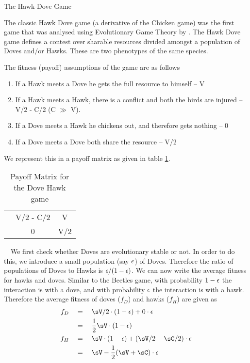 \documentclass{article}
\begin{document}
\begin{ssection}{The Hawk-Dove Game}

	The classic Hawk Dove game (a derivative of the Chicken game) was the first game that was analysed using Evolutionary Game Theory by \cite{smith}. The Hawk Dove game defines a contest over sharable resources divided amongst a population of Doves and/or Hawks. These are two phenotypes of the same species.

	The fitness (payoff) assumptions of the game are as follows
	\begin{enumerate}
		\item If a Hawk meets a Dove he gets the full resource to himself -- V
		\item If a Hawk meets a Hawk, there is a conflict and both the birds are injured -- V/2 - C/2 (C $\gg$ V).
		\item If a Dove meets a Hawk he chickens out, and therefore gets nothing -- 0
		\item If a Dove meets a Dove both share the resource -- V/2
	\end{enumerate}

	We represent this in a payoff matrix as given in table \ref{tab:payoff-dhg}.

	\begin{table}
		\centering
		\begin{tabular}{c | c | c}
			& \bt{Hawk} & \bt{Dove} \\
			\hline
			\bt{Hawk} & V/2 - C/2 & V \\
			\hline
			\bt{Dove} & 0 & V/2
		\end{tabular}
		\caption{Payoff Matrix for the Dove Hawk game}
		\label{tab:payoff-dhg}
	\end{table}

	 \ \ We first check whether Doves are evolutionary stable or not. In order to do this, we introduce a small population (say $\epsilon$) of Doves. Therefore the ratio of populations of Doves to Hawks is $\epsilon / (1 - \epsilon)$. We can now write the average fitness for hawks and doves. Similar to the Beetles game, with probability $1 - \epsilon$ the interaction is with a dove, and with probability $\epsilon$ the interaction is with a hawk. Therefore the average fitness of doves ($f_D$) and hawks ($f_H$) are given as
	\begin{align*}
		f_D &\eq \sV/2 \cdot (1 - \eps) + 0 \cdot \eps \\&\eq \frac{1}{2} \sV \cdot (1 - \eps) \\
		f_H &\eq \sV \cdot (1 - \eps) + \para{\sV/2 - \sC/2} \cdot \eps \\&\eq \sV - \frac{1}{2} (\sV + \sC) \cdot \eps
	\end{align*}


\end{ssection}
\end{document}
